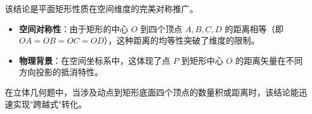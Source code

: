 \begin{explanationbox}
该结论是平面矩形性质在空间维度的完美对称推广。
\begin{itemize}
    \item \textbf{空间对称性}：由于矩形的中心 $O$ 到四个顶点 $A, B, C, D$ 的距离相等（即 $OA=OB=OC=OD$），这种距离的均等性突破了维度的限制。
    \item \textbf{物理背景}：在空间坐标系中，这体现了点 $P$ 到矩形中心 $O$ 的距离矢量在不同方向投影的抵消特性。
\end{itemize}
在立体几何题中，当涉及动点到矩形底面四个顶点的数量积或距离时，该结论能迅速实现"跨越式"转化。
\end{explanationbox}